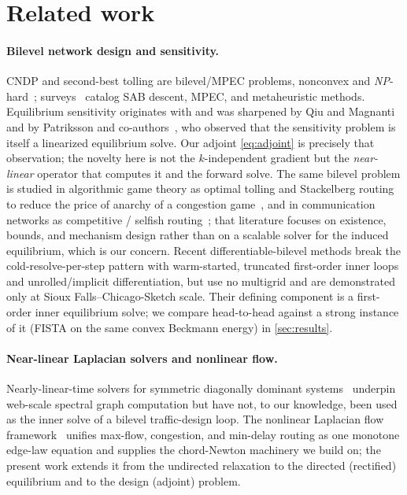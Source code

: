 \documentclass[ijoc]{informs3}
\begin{document}
\section{Related work}\label{sec:related}
\paragraph{Bilevel network design and sensitivity.}
CNDP and second-best tolling are bilevel/MPEC problems, nonconvex and \emph{NP}-hard~\citep{gairing2017,hoefer2008};
surveys~\citep{farahani2013} catalog SAB descent, MPEC, and metaheuristic methods. Equilibrium sensitivity
originates with \citet{tobinfriesz1988} and was sharpened by Qiu and Magnanti and by Patriksson
and co-authors~\citep{jp2007}, who observed that the sensitivity problem is itself a linearized equilibrium solve.
Our adjoint \cref{eq:adjoint} is precisely that observation; the novelty here is not the $k$-independent gradient
but the \emph{near-linear} operator that computes it and the forward solve. The same bilevel problem is studied
in algorithmic game theory as optimal tolling and Stackelberg routing to reduce the price of anarchy of a
congestion game~\citep{roughgarden2002,swamy2012,korilis1997,cole2003}, and in communication networks as competitive /
selfish routing~\citep{orda1993,larroca2013}; that literature focuses on existence, bounds, and mechanism design
rather than on a scalable solver for the induced equilibrium, which is our concern. Recent differentiable-bilevel
methods
\citep{li2022,goyal2023} break the cold-resolve-per-step pattern with warm-started, truncated first-order inner
loops and unrolled/implicit differentiation, but use no multigrid and are demonstrated only at Sioux
Falls--Chicago-Sketch scale. Their defining component is a first-order inner equilibrium solve; we compare
head-to-head against a strong instance of it (FISTA on the same convex Beckmann energy) in \cref{sec:results}.

\paragraph{Near-linear Laplacian solvers and nonlinear flow.}
Nearly-linear-time solvers for symmetric diagonally dominant systems~\citep{kyngsachdeva2016,lamgplus} underpin
web-scale spectral graph computation but have not, to our knowledge, been used as the inner solve of a bilevel
traffic-design loop. The nonlinear Laplacian flow framework~\citep{nlf} unifies max-flow, congestion, and
min-delay routing as one monotone edge-law equation and supplies the chord-Newton machinery we build on;
the present work extends it from the undirected relaxation to the directed (rectified) equilibrium and to the
design (adjoint) problem.
\end{document}
